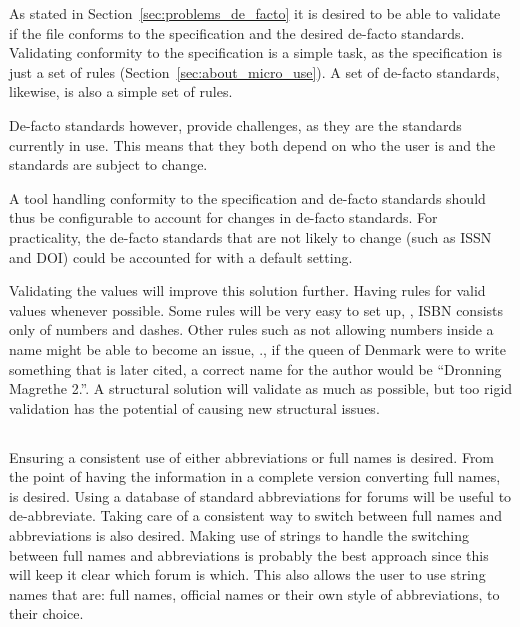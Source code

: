 As stated in Section~\ref{sec:problems_de_facto} it is desired to be
able to validate if the file conforms to the specification and the
desired de-facto standards.  Validating conformity to the
specification is a simple task, as the specification is just a set of
rules (Section~\ref{sec:about_micro_use}).  A set of de-facto
standards, likewise, is also a simple set of rules.

De-facto standards however, provide challenges, as they are the
standards currently in use.  This means that they both depend on who
the user is and the standards are subject to change.

A tool handling conformity to the specification and de-facto standards
should thus be configurable to account for changes in de-facto
standards.  For practicality, the de-facto standards that are not
likely to change (such as ISSN and DOI) could be accounted for with a
default setting.

Validating the values will improve this solution further.  Having
rules for valid values whenever possible.  Some rules will be very
easy to set up, \eg, ISBN consists only of numbers and dashes.  Other
rules such as not allowing numbers inside a name might be able to
become an issue, \eg., if the queen of Denmark were to write something
that is later cited, a correct name for the author would be ``Dronning
Magrethe 2.''.  A structural solution will validate as much as
possible, but too rigid validation has the potential of causing new
structural issues.


\subsection{}

Ensuring a consistent use of either abbreviations or full names is
desired.  From the point of having the information in a complete
version converting full names,  is desired.
Using a database of standard abbreviations for forums will be useful
to de-abbreviate.  Taking care of a consistent way to switch between
full names and abbreviations is also desired.  Making use of strings
to handle the switching between full names and abbreviations is
probably the best approach since this will keep it clear which forum
is which.  This also allows the user to use string names that are:
full names, official names or their own style of abbreviations, to
their choice.


\subsection{}

